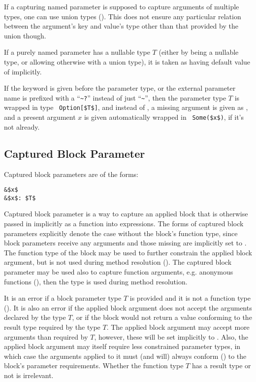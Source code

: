 If a capturing named parameter is supposed to capture arguments of multiple types, one can use union types (). This does not ensure any particular relation between the argument's key and value's type other than that provided by the union though.

If a purely named parameter has a nullable type $T$ (either by being a nullable type, or allowing otherwise  with a union type), it is taken as having default value of  implicitly. 


If the keyword  is given before the parameter type, or the external parameter name is prefixed with a ``\lstinline!~?!'' instead of just ``\lstinline!~!'', then the parameter type $T$ is wrapped in type ~\lstinline!Option[$T$]!, and instead of , a missing argument is given as , and a present argument $x$ is given automatically wrapped in ~\lstinline!Some($x$)!, if it's not already. 





\subsection{Captured Block Parameter}
\label{sec:captured-block-parameter}

Captured block parameters are of the forms:
\begin{lstlisting}
&$x$
&$x$: $T$
\end{lstlisting}

Captured block parameter is a way to capture an applied block that is otherwise passed in implicitly as a function into  expressions. The forms of captured block parameters explicitly denote the case without the block's function type, since block parameters receive any arguments and those missing are implicitly set to . The function type of the block may be used to further constrain the applied block argument, but is not used during method resolution (). The captured block parameter may be used also to capture function arguments, e.g. anonymous functions (), then the type is used during method resolution. 

It is an error if a block parameter type $T$ is provided and it is not a function type (). It is also an error if the applied block argument does not accept the arguments declared by the type $T$, or if the block would not return a value conforming to the result type required by the type $T$. The applied block argument may accept more arguments than required by $T$, however, these will be set implicitly to . Also, the applied block argument may itself require less constrained parameter types, in which case the arguments applied to it must (and will) always conform () to the block's parameter requirements. Whether the function type $T$ has a result type or not is irrelevant. 

